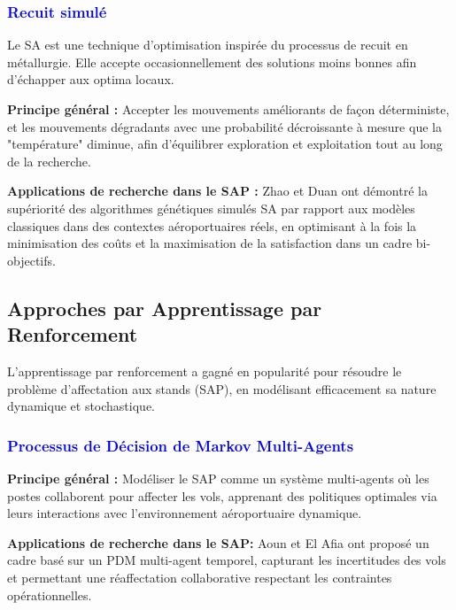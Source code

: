 \subsubsection*{\small{\textcolor{blue}{Recuit simulé}}}


Le \ac{SA} est une technique d’optimisation inspirée du processus de recuit en métallurgie. Elle accepte occasionnellement des solutions moins bonnes afin d’échapper aux optima locaux.

\textbf{Principe général :}  
Accepter les mouvements améliorants de façon déterministe, et les mouvements dégradants avec une probabilité décroissante à mesure que la "température" diminue, afin d’équilibrer exploration et exploitation tout au long de la recherche.  
 
\textbf{Applications de recherche dans le SAP :} Zhao et Duan \cite{Zhao_2021} ont démontré la supériorité des algorithmes génétiques simulés \ac{SA} par rapport aux modèles classiques dans des contextes aéroportuaires réels, en optimisant à la fois la minimisation des coûts et la maximisation de la satisfaction dans un cadre bi-objectifs.

\vspace{-0.8em}
\subsection*{Approches par Apprentissage par Renforcement}
\vspace{-0.5em}
L’apprentissage par renforcement a gagné en popularité pour résoudre le problème d’affectation aux stands (\ac{SAP}), en modélisant efficacement sa nature dynamique et stochastique.

\vspace{-0.5em}
\subsubsection*{\small{\textcolor{blue}{Processus de Décision de Markov Multi-Agents}}}
\vspace{-0.5em}

\textbf{Principe général :}  
Modéliser le \ac{SAP} comme un système multi-agents où les postes collaborent pour affecter les vols, apprenant des politiques optimales via leurs interactions avec l’environnement aéroportuaire dynamique.

\textbf{Applications de recherche dans le \ac{SAP}:}  
Aoun et El Afia \cite{Aoun_2018} ont proposé un cadre basé sur un PDM multi-agent temporel, capturant les incertitudes des vols et permettant une réaffectation collaborative respectant les contraintes opérationnelles.


